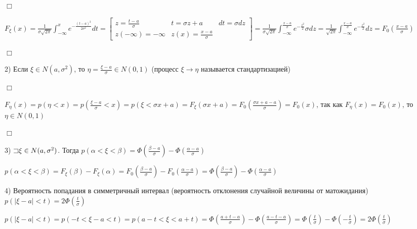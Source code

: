 \documentclass[12pt]{article}
\begin{document}
    \begin{MyProof}
        $\Box$
        
        $F_\xi(x) = \frac{1}{\sigma\sqrt{2\pi}} \int_{-\infty}^x e^{-\frac{(t - a)^2}{2\sigma^2}} dt = \left[\begin{matrix}z = \frac{t - a}{\sigma} & t = \sigma z + a & dt = \sigma dz \\ z (-\infty) = -\infty & z(x) = \frac{x - a}{\sigma} & \end{matrix}\right] = 
        \frac{1}{\sigma\sqrt{2\pi}} \int_{-\infty}^\frac{x - a}{\sigma} e^{-\frac{z^2}{2}} \sigma dz = \frac{1}{\sqrt{2\pi}} \int_{-\infty}^\frac{x - a}{\sigma} e^{-\frac{z^2}{2}} dz = F_0\left(\frac{x - a}{\sigma}\right)$
        
        $\Box$
    \end{MyProof}

    2) Если $\xi \in N(a, \sigma^2)$, то $\eta = \frac{\xi - a}{\sigma} \in N(0, 1)$ (процесс $\xi \to \eta$ называется стандартизацией)

    \begin{MyProof}
        $\Box$
        
        $F_\eta(x) = p(\eta < x) = p\left(\frac{\xi - a}{\sigma} < x\right) = p(\xi < \sigma x + a) = F_\xi(\sigma x + a) = F_0\left(\frac{\sigma x + a - a}{\sigma}\right) = F_0(x)$, так как $F_\eta(x) = F_0(x)$, то $\eta \in N(0, 1)$
        
        $\Box$
    \end{MyProof}

    3) $\mathord{\sqsupset} \xi \in N(a, \sigma^2)$. Тогда $p(\alpha < \xi < \beta) = \Phi\left(\frac{\beta - a}{\sigma}\right) - \Phi\left(\frac{\alpha - a}{\sigma}\right)$

    \begin{MyProof}
        $p(\alpha < \xi < \beta) = F_\xi(\beta) - F_\xi(\alpha) = F_0\left(\frac{\beta - a}{\sigma}\right) - F_0\left(\frac{\alpha - a}{\sigma}\right) = \Phi\left(\frac{\beta - a}{\sigma}\right) - \Phi\left(\frac{\alpha - a}{\sigma}\right)$
    \end{MyProof}

    4) Вероятность попадания в симметричный интервал (вероятность отклонения случайной величины от матожидания) 
    $p(|\xi - a| < t) = 2\Phi\left(\frac{t}{\sigma}\right)$

    \begin{MyProof}
        $p(|\xi - a| < t) = p(-t < \xi - a < t) = p(a - t < \xi < a + t) = \Phi\left(\frac{a + t - a}{\sigma}\right) - \Phi\left(\frac{a - t - a}{\sigma}\right) = \Phi\left(\frac{t}{\sigma}\right) - \Phi\left(-\frac{t}{\sigma}\right) = 2\Phi\left(\frac{t}{\sigma}\right)$
    \end{MyProof}
\end{document}
